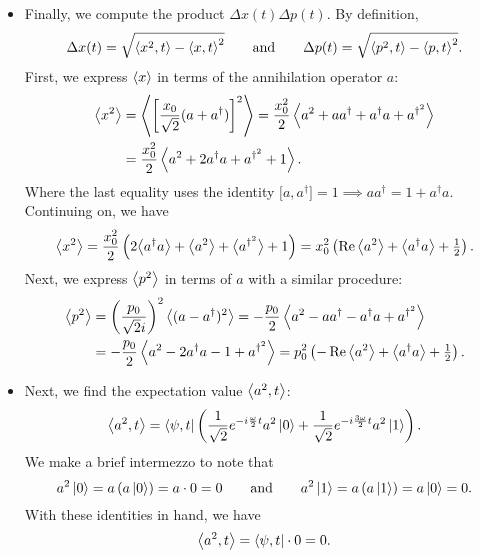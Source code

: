 \documentclass[11pt, a4paper]{article}
\newcommand{\eqtext}[1]{\qquad \text{#1} \qquad}
\newcommand{\evb}[1]{\big \langle {#1} \big \rangle}  %
\begin{document}
\begin{itemize}
	\item Finally, we compute the product $ \Delta x(t) \Delta p(t) $. By definition,
	\begin{equation*}
		\Delta x(t) = \sqrt{\ev{x^{2}, t} - \ev{x, t}^{2}} \eqtext{and} \Delta p(t) = \sqrt{\ev{p^{2}, t} - \ev{p, t}^{2}}.
	\end{equation*}
	First, we express $ \ev{x} $ in terms of the annihilation operator $ a $:
	\begin{align*}
		\ev{x^{2}} &= \ev{\left[\frac{x_{0}}{\sqrt{2}}(a + a^{\dagger})\right]^{2}} = \frac{x_{0}^{2}}{2}\ev{a^{2} + aa^{\dagger} + a^{\dagger}a + a^{\dagger^{2}}}\\
		&= \frac{x_{0}^{2}}{2}\ev{a^{2} + 2a^{\dagger}a + a^{\dagger^{2}}+1}.
	\end{align*}
	Where the last equality uses the identity $ \big[a, a^{\dagger}\big] = 1 \implies aa^{\dagger} = 1 + a^{\dagger}a $. Continuing on, we have
	\begin{equation*}
		\ev{x^{2}} = \frac{x_{0}^{2}}{2}\left(2\evb{a^{\dagger}a} + \ev{a^{2}}+ \evb{a^{\dagger^{2}}}+1\right) = x_{0}^{2}\left(\Re\ev{a^{2}} + \evb{a^{\dagger}a} + \tfrac{1}{2}\right).
	\end{equation*}
	Next, we express $ \ev{p^{2}} $ in terms of $ a $ with a similar procedure:
	\begin{align*}
		\ev{p^{2}} &= \left(\frac{p_{0}}{\sqrt{2}i}\right)^{2}\ev{(a - a^{\dagger})^{2}} = -\frac{p_{0}}{2}\ev{a^{2}- aa^{\dagger} - a^{\dagger}a + a^{\dagger^{2}}}\\
		& = -\frac{p_{0}}{2} \ev{a^{2} - 2a^{\dagger}a -1 + a^{\dagger^{2}}} = p_{0}^{2}\left(-\Re \ev{a^{2}} + \evb{a^{\dagger}a} + \tfrac{1}{2}\right).
	\end{align*}
	\item Next, we find the expectation value $ \ev{a^{2}, t} $:
	\begin{equation*}
		\ev{a^{2}, t} = \bra{\psi, t}\left(\frac{1}{\sqrt{2}}e^{-i\frac{\omega}{2}t}a^{2}\ket{0} + \frac{1}{\sqrt{2}}e^{-i\frac{3\omega}{2}t}a^{2}\ket{1} \right).
	\end{equation*}
	We make a brief intermezzo to note that
	\begin{equation*}
		a^{2}\ket{0} = a\left(a\ket{0}\right) = a \cdot 0 = 0 \eqtext{and} a^{2}\ket{1} = a\left(a\ket{1}\right) = a\ket{0} = 0.
	\end{equation*}
	With these identities in hand, we have
	\begin{equation*}
		\ev{a^{2}, t} = \bra{\psi, t} \cdot 0 = 0.
	\end{equation*}
	

\end{itemize}
\end{document}
